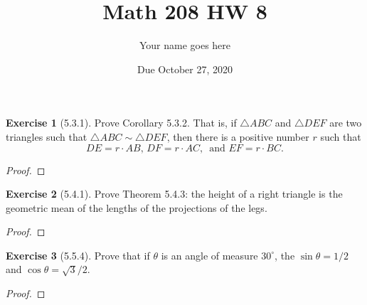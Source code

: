 \documentclass[11pt]{article}		%
\title{Math 208 HW 8}
\author{Your name goes here}  %
\date{Due October 27, 2020}
\theoremstyle{definition}
\newtheorem*{ex}{Exercise}
\begin{document}
	\maketitle
	
	





\begin{ex}[5.3.1]
Prove Corollary 5.3.2.  That is, if $\triangle ABC$ and $\triangle DEF$ are two triangles such that $\triangle ABC \sim \triangle DEF$, then there is a positive number $r$ such that
\[DE = r \cdot AB, \, DF = r \cdot AC, \, \text{ and } EF = r \cdot BC.  \]	
	
\end{ex}

\begin{proof} 
	
\end{proof}


\vspace{1in} %






\begin{ex}[5.4.1]
	Prove Theorem 5.4.3: the height of a right triangle is the geometric mean of the lengths of the projections of the legs.
	
\end{ex}

\begin{proof} 
	
\end{proof}


\vspace{1in} %





\begin{ex}[5.5.4]
	Prove that if $\theta$ is an angle of measure $30^\circ$, the $\sin \theta = 1/2$ and $\cos \theta = \sqrt{3}/2$.
	
\end{ex}

\begin{proof} 
	
\end{proof}
\end{document}
